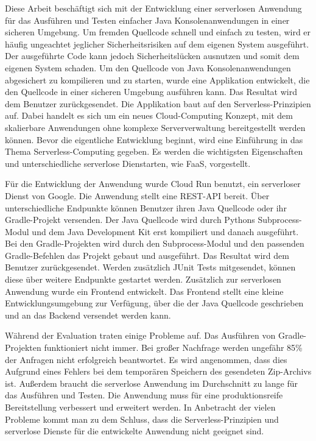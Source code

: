 \begin{center} 
    \huge {}
\end{center}

Diese Arbeit beschäftigt sich mit der Entwicklung einer
serverlosen Anwendung für das Ausführen und Testen einfacher Java
Konsolenanwendungen in einer sicheren Umgebung.
Um fremden Quellcode schnell und einfach zu testen,
wird er häufig ungeachtet jeglicher Sicherheitsrisiken
auf dem eigenen System ausgeführt. Der ausgeführte Code kann
jedoch Sicherheitslücken ausnutzen und somit dem eigenen
System schaden. Um den Quellcode von Java Konsolenanwendungen
abgesichert zu kompilieren und zu starten, wurde eine Applikation entwickelt,
die den Quellcode in einer sicheren Umgebung ausführen kann. Das
Resultat wird dem Benutzer zurückgesendet. Die Applikation
baut auf den Serverless-Prinzipien auf. Dabei handelt es
sich um ein neues Cloud-Computing Konzept, mit dem
skalierbare Anwendungen ohne komplexe Serververwaltung
bereitgestellt werden können.
Bevor die eigentliche Entwicklung beginnt, wird eine Einführung
in das Thema Serverless-Computing gegeben. Es werden die
wichtigsten Eigenschaften und unterschiedliche serverlose
Dienstarten, wie FaaS, vorgestellt.

Für die Entwicklung der Anwendung wurde Cloud Run
benutzt, ein serverloser Dienst von Google. Die Anwendung
stellt eine REST-API bereit. Über unterschiedliche Endpunkte können
Benutzer ihren Java Quellcode oder ihr Gradle-Projekt versenden.
Der Java Quellcode wird durch Pythons Subprocess-Modul und dem
Java Development Kit erst kompiliert und danach ausgeführt.
Bei den Gradle-Projekten wird durch den Subprocess-Modul und den
passenden Gradle-Befehlen das Projekt gebaut und ausgeführt.
Das Resultat wird dem Benutzer zurückgesendet. Werden
zusätzlich JUnit Tests mitgesendet, können diese über
weitere Endpunkte gestartet werden. Zusätzlich zur
serverlosen Anwendung wurde ein Frontend entwickelt.
Das Frontend stellt eine kleine Entwicklungsumgebung zur Verfügung,
über die der Java Quellcode geschrieben und an das Backend versendet
werden kann.

Während der Evaluation traten einige Probleme auf.
Das Ausführen von Gradle-Projekten funktioniert nicht immer.
Bei großer Nachfrage werden ungefähr 85\% der Anfragen nicht erfolgreich
beantwortet. Es wird angenommen, dass dies Aufgrund eines Fehlers
bei dem temporären Speichern des gesendeten Zip-Archivs ist.
Außerdem braucht die serverlose Anwendung im Durchschnitt zu lange
für das Ausführen und Testen. Die Anwendung muss für eine
produktionsreife Bereitstellung verbessert und erweitert werden.
In Anbetracht der vielen Probleme kommt man zu dem Schluss,
dass die Serverless-Prinzipien und serverlose Dienste
für die entwickelte Anwendung nicht geeignet sind.

